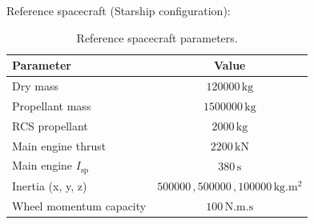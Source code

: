 \documentclass[11pt,a4paper]{article}
\newcommand{\SI}[2]{#1\,\mathrm{#2}}
\begin{document}
Reference spacecraft (Starship configuration):

\begin{table}[h]
\centering
\begin{tabular}{lc}
\toprule
\textbf{Parameter} & \textbf{Value} \\
\midrule
Dry mass & $\SI{120000}{kg}$ \\
Propellant mass & $\SI{1500000}{kg}$ \\
RCS propellant & $\SI{2000}{kg}$ \\
Main engine thrust & $\SI{2200}{kN}$ \\
Main engine $I_\text{sp}$ & $\SI{380}{s}$ \\
Inertia (x, y, z) & $\SI{500000}{}, \SI{500000}{}, \SI{100000}{kg.m^2}$ \\
Wheel momentum capacity & $\SI{100}{N.m.s}$ \\
\bottomrule
\end{tabular}
\caption{Reference spacecraft parameters.}
\end{table}
\end{document}
